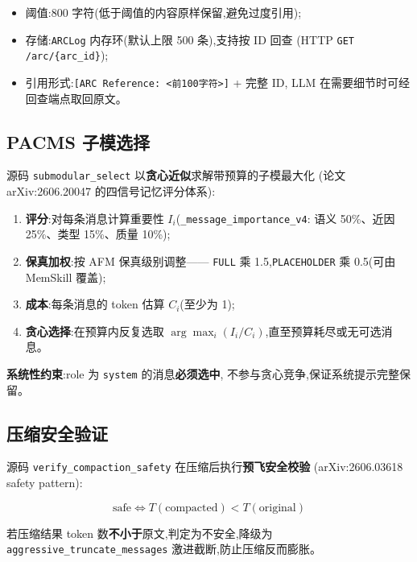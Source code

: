 \documentclass[11pt,a4paper]{article}
\begin{document}
\begin{itemize}
  \item 阈值:800 字符(低于阈值的内容原样保留,避免过度引用);
  \item 存储:\texttt{ARCLog} 内存环(默认上限 500 条),支持按 ID 回查
        (HTTP \texttt{GET /arc/\{arc\_id\}});
  \item 引用形式:\texttt{[ARC Reference: <前100字符>]} + 完整 ID,
        LLM 在需要细节时可经回查端点取回原文。
\end{itemize}

\subsection{PACMS 子模选择}

源码 \texttt{submodular\_select} 以\textbf{贪心近似}求解带预算的子模最大化
(论文 arXiv:2606.20047 的四信号记忆评分体系):

\begin{enumerate}[leftmargin=2em]
  \item \textbf{评分}:对每条消息计算重要性 $I_i$(\texttt{\_message\_importance\_v4}:
        语义 50\%、近因 25\%、类型 15\%、质量 10\%);
  \item \textbf{保真加权}:按 AFM 保真级别调整——
        \texttt{FULL} 乘 1.5,\texttt{PLACEHOLDER} 乘 0.5(可由 MemSkill 覆盖);
  \item \textbf{成本}:每条消息的 token 估算 $C_i$(至少为 1);
  \item \textbf{贪心选择}:在预算内反复选取
        $\arg\max_i (I_i / C_i)$,直至预算耗尽或无可选消息。
\end{enumerate}

\textbf{系统性约束}:role 为 \texttt{system} 的消息\textbf{必须选中},
不参与贪心竞争,保证系统提示完整保留。

\subsection{压缩安全验证}

源码 \texttt{verify\_compaction\_safety} 在压缩后执行\textbf{预飞安全校验}
(arXiv:2606.03618 safety pattern):

\begin{equation}
  \text{safe} \iff T(\text{compacted}) < T(\text{original})
  \label{eq:safety}
\end{equation}

若压缩结果 token 数\textbf{不小于}原文,判定为不安全,降级为
\texttt{aggressive\_truncate\_messages} 激进截断,防止压缩反而膨胀。
\end{document}
